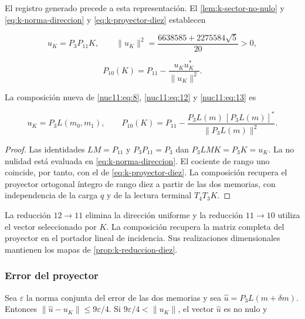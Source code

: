 El registro generado precede a esta representación.
El \cref{lem:k-sector-no-nulo} y
\eqref{eq:k-norma-direccion} y \eqref{eq:k-proyector-diez} establecen



\[
u_K=P_3P_{11}K,\qquad
\|u_K\|^2=\frac{6638585+2275584\sqrt5}{20}>0,
\]





\begin{equation}
P_{10}(K)=P_{11}-\frac{u_Ku_K^*}{\|u_K\|^2}.
\label{nuc11:eq:13}
\end{equation}



La composición nueva de \eqref{nuc11:eq:8}, \eqref{nuc11:eq:12} y \eqref{nuc11:eq:13} es



\begin{equation}
\boxed{
u_K=P_3L(m_0,m_1),\qquad
P_{10}(K)=P_{11}-
\frac{P_3L(m)\,[P_3L(m)]^*}{\|P_3L(m)\|^2}.
}
\label{nuc11:eq:14}
\end{equation}



\begin{proof}
Las identidades \(LM=P_{11}\) y \(P_3P_{11}=P_3\) dan
\(P_3LMK=P_3K=u_K\).
La no nulidad está evaluada en \eqref{eq:k-norma-direccion}.
El cociente de rango uno coincide, por tanto, con el de
\eqref{eq:k-proyector-diez}.
La composición recupera el proyector ortogonal íntegro de rango
diez a partir de las dos memorias, con independencia de la carga
\(q\) y de la lectura terminal \(T_4T_3K\).
\end{proof}

La reducción \(12\to11\) elimina la dirección uniforme y la
reducción \(11\to10\) utiliza el vector seleccionado por \(K\).
La composición recupera la matriz completa del proyector en el
portador lineal de incidencia.
Sus realizaciones dimensionales mantienen los mapas de
\cref{prop:k-reduccion-diez}.

\subsubsection{Error del proyector}

Sea \(\varepsilon\) la norma conjunta del error de las dos
memorias y sea \(\widehat u=P_3L(m+\delta m)\).
Entonces \(\|\widehat u-u_K\|\le9\varepsilon/4\).
Si \(9\varepsilon/4<\|u_K\|\), el vector \(\widehat u\) es no
nulo y



